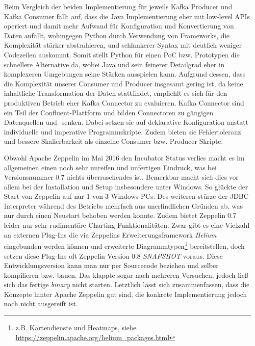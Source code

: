 Beim Vergleich der beiden Implementierung für jeweils Kafka Producer und Kafka Consumer fällt auf, dass die Java Implementierung eher mit low-level APIs operiert und damit mehr Aufwand für Konfiguration und Konvertierung von Daten anfällt, wohingegen Python durch Verwendung von Frameworks, die Komplexität stärker abstrahieren, und schlankerer Syntax mit deutlich weniger Codezeilen auskommt. Somit stellt Python für einen PoC bzw. Prototypen die schnellere Alternative da, wobei Java und sein feinerer Detailgrad eher in komplexeren Umgebungen seine Stärken ausspielen kann.\newline
Aufgrund dessen, dass die Komplexität unserer Consumer und Producer insgesamt gering ist, da keine inhaltliche Transformation der Daten stattfindet, empfiehlt es sich für den produktiven Betrieb eher Kafka Connector zu evaluieren. Kafka Connector sind ein  Teil der Confluent-Plattform und bilden Connectoren zu gängigen Datenquellen und -senken. Dabei setzen sie auf deklarative Konfiguration anstatt individuelle und imperative Programmskripte. Zudem bieten sie Fehlertoleranz und bessere Skalierbarkeit als einzelne Consumer bzw. Producer Skripte.

Obwohl Apache Zeppelin im Mai 2016 den Incubator Status verlies macht es im allgemeinen einen noch sehr unreifen und unfertigen Eindruck,
was bei Versionsnummer 0.7 nichts überraschendes ist.
Bemerkbar macht sich dies vor allem bei der Installation und Setup insbesondere unter Windows.
So glückte der Start von Zeppelin auf nur 1 von 3 Windows PCs.
Des weiteren stürze der JDBC Interpreter während des Betriebs mehrfach aus unerfindlichen Gründen ab, was nur durch einen Neustart behoben werden konnte.
Zudem bietet Zeppelin 0.7 leider nur sehr rudimentäre Charting-Funktionalitäten.
Zwar gibt es eine Vielzahl an externen Plug-Ins die via Zeppelins Erweiterungsframework \textit{Helium} eingebunden werden können und erweiterte Diagrammtypen\footnote{z.B. Kartendienste und  Heatmaps, siehe \href{https://zeppelin.apache.org/helium_packages.html}{https://zeppelin.apache.org/helium\_packages.html} } bereitstellen, doch setzen diese Plug-Ins oft Zeppelin Version 0.8-\textit{SNAPSHOT} voraus. Diese Entwicklungsversion kann man nur per Sourcecode beziehen und selber kompilieren bzw. bauen.
Das klappte sogar nach mehreren Versuchen, jedoch ließ sich das fertige \textit{binary} nicht starten.\newline
Letztlich lässt sich zusammenfassen, dass die Konzepte hinter Apache Zeppelin gut sind, die konkrete Implementierung jedoch noch nicht ausgereift ist.

